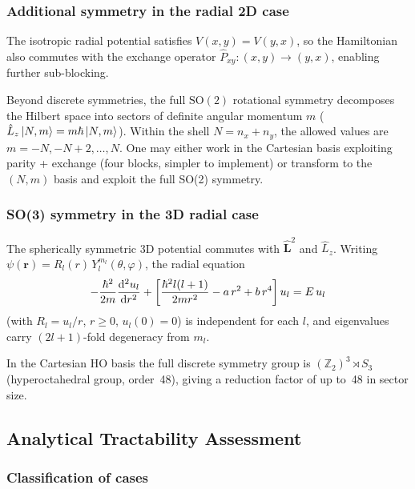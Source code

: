 \subsubsection{Additional symmetry in the radial 2D case}

The isotropic radial potential satisfies $V(x,y)=V(y,x)$, so the Hamiltonian
also commutes with the exchange operator
$\hat{P}_{xy}\colon (x,y)\to(y,x)$, enabling further sub-blocking.

Beyond discrete symmetries, the full $\mathrm{SO}(2)$ rotational symmetry
decomposes the Hilbert space into sectors of definite angular momentum $m$
($\hat{L}_z\ket{N,m}=m\hbar\ket{N,m}$).  Within the shell
$N = n_x + n_y$, the allowed values are $m = -N, -N+2, \dots, N$.
One may either work in the Cartesian basis exploiting parity + exchange
(four blocks, simpler to implement) or transform to the $(N,m)$ basis and
exploit the full SO(2) symmetry.

\subsubsection{SO(3) symmetry in the 3D radial case}

The spherically symmetric 3D potential commutes with $\hat{\mathbf{L}}^2$
and $\hat{L}_z$.  Writing
$\psi(\mathbf{r}) = R_l(r)\,Y_l^{m_l}(\theta,\varphi)$, the radial
equation
\begin{equation}\label{eq:radial_3d_reduced}
    -\frac{\hbar^2}{2m}\dv[2]{u_l}{r}
    + \left[\frac{\hbar^2 l(l+1)}{2m r^2} - a\,r^2 + b\,r^4\right]u_l = E\,u_l
\end{equation}
(with $R_l = u_l/r$, $r\geq 0$, $u_l(0)=0$) is independent for each $l$,
and eigenvalues carry $(2l+1)$-fold degeneracy from $m_l$.

In the Cartesian HO basis the full discrete symmetry group is
$(\mathbb{Z}_2)^3 \rtimes S_3$ (hyperoctahedral group, order~48), giving
a reduction factor of up to~48 in sector size.

\subsection{Analytical Tractability Assessment}\label{sec:tractability}

\subsubsection{Classification of cases}

